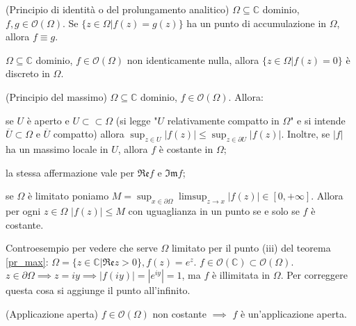 \begin{thm}
  (Principio di identità o del prolungamento analitico) $\Omega \subseteq \mathbb{C}$ dominio, $f, g \in \mathcal{O}(\Omega)$. Se $\{z \in \Omega | f(z)=g(z)\}$ ha un punto di accumulazione in $\Omega$, allora $f \equiv g$.
\end{thm}

\begin{cor} \label{olo_discr}
  $\Omega \subseteq \mathbb{C}$ dominio, $f \in \mathcal{O}(\Omega)$ non identicamente nulla, allora $\{z \in \Omega | f(z)=0\}$ è discreto in $\Omega$.
\end{cor}

\begin{thm} \label{pr_max}
  (Principio del massimo) $\Omega \subseteq \mathbb{C}$ dominio, $f \in \mathcal{O}(\Omega)$. Allora:
  \begin{nlist}
    \item se $U$ è aperto e $U \subset \subset \Omega$ (si legge "$U$ relativamente compatto in $\Omega$" e si intende $\overline{U} \subset \Omega$ e $\overline{U}$ compatto) allora $\displaystyle \sup_{z \in U} |f(z)| \le \sup_{z \in \partial U} |f(z)|$. Inoltre, se $|f|$ ha un massimo locale in $U$, allora $f$ è costante in $\Omega$;
    \item la stessa affermazione vale per $\mathfrak{Re} f$ e $\mathfrak{Im} f$;
    \item se $\Omega$ è limitato poniamo $\displaystyle M=\sup_{x \in \partial\Omega} \limsup_{z \longrightarrow x} |f(z)| \in [0, +\infty]$. Allora per ogni $z \in \Omega$ $|f(z)| \le M$ con uguaglianza in un punto se e solo se $f$ è costante.
  \end{nlist}
\end{thm}

\begin{ex}
  Controesempio per vedere che serve $\Omega$ limitato per il punto (iii) del teorema \ref{pr_max}: $\Omega=\{z \in \mathbb{C} | \mathfrak{Re} z>0\}, f(z)=e^z$. $f \in \mathcal{O}(\mathbb{C}) \subset \mathcal{O}(\Omega)$.
  $z \in \partial\Omega \implies z=iy \implies |f(iy)|=|e^{iy}|=1$, ma $f$ è illimitata in $\Omega$. Per correggere questa cosa si aggiunge il punto all'infinito.
\end{ex}

\begin{thm}
  (Applicazione aperta) $f \in \mathcal{O}(\Omega)$ non costante $\implies$ $f$ è un'applicazione aperta.
\end{thm}

